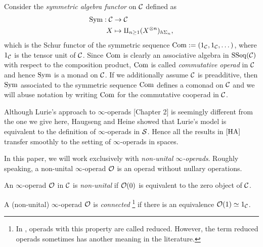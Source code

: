 \begin{example}
\label{Symmetric algebra}
	Consider the \emph{symmetric algebra functor} on ${\mathcal{C}}$ defined as 
	\begin{align*}
		\operatorname{Sym}:{\mathcal{C}} & \to  {\mathcal{C}}\\
		X & \mapsto \amalg_{n\geq 1} (X^{\otimes n})_{h\Sigma_n},
	\end{align*}
	which is the Schur functor of the symmetric sequence $\operatorname{Com}:=(1_{\mathcal{C}},1_{\mathcal{C}},\dots)$, where $1_{\mathcal{C}}$ is the tensor unit of ${\mathcal{C}}$.
	Since $\operatorname{Com}$ is clearly an associative algebra in $\operatorname{SSeq}({\mathcal{C}})$ with respect to the 
	composition product, $\operatorname{Com}$ is called \emph{commutative operad} in ${\mathcal{C}}$ and hence
	$\operatorname{Sym}$ is a monad on ${\mathcal{C}}$.
	If we additionally assume ${\mathcal{C}}$ is preadditive, then $\operatorname{Sym}$ associated to the symmetric sequence $\operatorname{Com}$ defines a comonad on ${\mathcal{C}}$ and we will abuse notation by writing $\operatorname{Com}$ for the commutative cooperad in ${\mathcal{C}}$.
\end{example}

\begin{remark}
Although Lurie's approach to $\infty$-operads \cite{HA}[Chapter 2] is seemingly different from the one we give here,
Haugseng \cite{Haugsengsymseq} and Heine \cite{Hadrianphdthesis} showed that Lurie's model is equivalent to the definition of $\infty$-operads in $\operatorname{\mathcal{S}}$. Hence all the results in $\cite{HA}$ transfer smoothly to the setting of $\infty$-operads in spaces.
\end{remark}

In this paper, we will work exclusively with \emph{non-unital $\infty$-operads}. Roughly speaking, a non-unital $\infty$-operad ${\mathcal{O}}$ is an operad without nullary operations.
\begin{definition}
	\label{non-unital operad}
	An $\infty$-operad ${\mathcal{O}}$ in ${\mathcal{C}}$ is \emph{non-unital} if ${\mathcal{O}}(0)$ is equivalent to the zero object of ${\mathcal{C}}$. 
\end{definition}

\begin{definition}
	A (non-unital) $\infty$-operad ${\mathcal{O}}$ is \emph{connected} \footnote{In \cite{ChingBar}, operads with this property are called reduced. However, the term reduced operads sometimes has another meaning in the literature.} if there is an equivalence ${\mathcal{O}}(1)\simeq 1_{{\mathcal{C}}}$. 
\end{definition}


